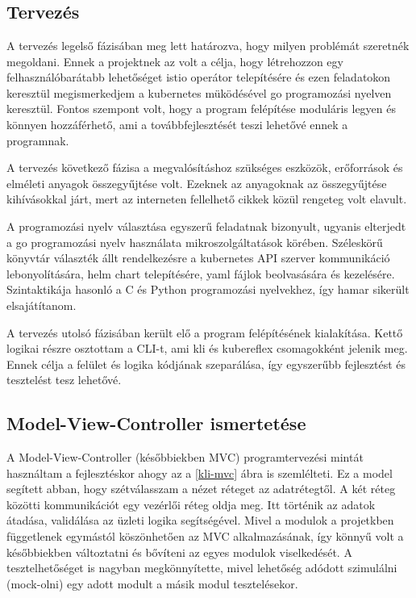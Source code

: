 \chapter{\kli}
\section{Tervezés}
A tervezés legelső fázisában meg lett határozva, hogy milyen problémát szeretnék megoldani.
Ennek a projektnek az volt a célja, hogy létrehozzon egy felhasználóbarátabb lehetőséget istio operátor telepítésére és ezen feladatokon keresztül megismerkedjem a kubernetes müködésével go programozási nyelven keresztül.
Fontos szempont volt, hogy a program felépítése moduláris legyen és könnyen hozzáférhető, ami a továbbfejlesztését teszi lehetővé ennek a programnak.

A tervezés következő fázisa a megvalósításhoz szükséges eszközök, erőforrások és elméleti anyagok összegyűjtése volt.
Ezeknek az anyagoknak az összegyűjtése kihívásokkal járt, mert az interneten fellelhető cikkek közül rengeteg volt elavult.

A programozási nyelv választása egyszerű feladatnak bizonyult, ugyanis elterjedt a go programozási nyelv használata mikroszolgáltatások körében.
Széleskörű könyvtár választék állt rendelkezésre a kubernetes API szerver kommunikáció lebonyolítására, helm chart telepítésére, yaml fájlok beolvasására és kezelésére.
Szintaktikája hasonló a C és Python programozási nyelvekhez, így hamar sikerült elsajátítanom.

A tervezés utolsó fázisában került elő a program felépítésének kialakítása.
Kettő logikai részre osztottam a CLI-t, ami kli és kubereflex csomagokként jelenik meg.
Ennek célja a felület és logika kódjának szeparálása, így egyszerűbb fejlesztést és tesztelést tesz lehetővé.

\section{Model-View-Controller ismertetése}
A Model-View-Controller (későbbiekben MVC) programtervezési mintát használtam a fejlesztéskor ahogy az a \ref{kli-mvc} ábra is szemlélteti.
Ez a model segített abban, hogy szétválasszam a nézet réteget az adatrétegtől.
A két réteg közötti kommunikációt egy vezérlői réteg oldja meg.
Itt történik az adatok átadása, validálása az üzleti logika segítségével.
Mivel a modulok a projetkben függetlenek egymástól köszönhetően az MVC alkalmazásának, így könnyű volt a későbbiekben változtatni és bővíteni az egyes modulok viselkedését.
A tesztelhetőséget is nagyban megkönnyítette, mivel lehetőség adódott szimulálni (mock-olni) egy adott modult a másik modul tesztelésekor.

